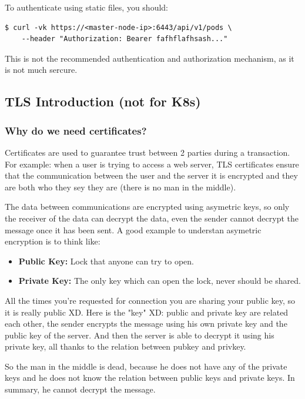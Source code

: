 \documentclass{article}
\newenvironment{blocktemplateIII}[1]{%
    \tcolorbox[beamer,%
    noparskip,breakable,
    ,colframe=Red,%
    colbacklower=LimeGreen!75!LightGreen,%
    title=#1]}%
    {\endtcolorbox}
\newenvironment{codetemplate}[1][]{%
  \mybasecolorbox[#1]
  \itshape
}{%
  \endmybasecolorbox
}
\begin{document}
To authenticate using static files, you should:
\begin{codetemplate}{}
\begin{verbatim}
$ curl -vk https://<master-node-ip>:6443/api/v1/pods \
    --header "Authorization: Bearer fafhflafhsash..."
\end{verbatim}
\end{codetemplate}

\begin{blocktemplateIII}{WARNING}
This is not the recommended authentication and authorization mechanism, as it is not much sercure.
\end{blocktemplateIII}

\subsection{TLS Introduction (not for K8s)}

\subsubsection{Why do we need certificates?}
Certificates are used to guarantee trust between 2 parties during a transaction. For example: when a user is trying to access a web server, TLS certificates ensure that the communication between the user and the server it is encrypted and they are both who they sey they are (there is no man in the middle).

The data between communications are encrypted using asymetric keys, so only the receiver of the data can decrypt the data, even the sender cannot decrypt the message once it has been sent. A good example to understan asymetric encryption is to think like:
\begin{itemize}
    \item \textbf{Public Key:} Lock that anyone can try to open.
    \item \textbf{Private Key:} The only key which can open the lock, never should be shared.
\end{itemize}

All the times you're requested for connection you are sharing your public key, 
so it is really public XD. Here is the "key" XD: public and private key are related each other,
the sender encrypts the message using his own private key and the public key of the server. And then the server is able to
decrypt it using his private key, all thanks to the relation between pubkey and privkey. 

So the man in the middle is dead, because he does not have any of the private keys and he does not know the relation between public keys and private keys. In summary, he cannot decrypt the message.
\end{document}
